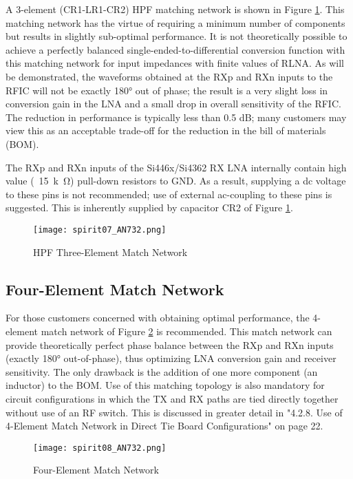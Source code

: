       A 3-element (CR1-LR1-CR2) HPF matching network is shown in Figure \ref{EXP001:fig_spirit07}. 
      This matching network has the virtue of requiring a minimum number of components but results 
      in slightly sub-optimal performance. It is not theoretically possible to achieve a perfectly 
      balanced single-ended-to-differential conversion function with this matching network for 
      input impedances with finite values of RLNA. As will be demonstrated, the waveforms obtained 
      at the RXp and RXn inputs to the RFIC will not be exactly 180° out of phase; the result is a 
      very slight loss in conversion gain in the LNA and a small drop in overall sensitivity of the 
      RFIC. The reduction in performance is typically less than 0.5 dB; many customers may view 
      this as an acceptable trade-off for the reduction in the bill of materials (BOM).
      
      The RXp and RXn inputs of the Si446x/Si4362 RX LNA internally contain high value 
      (~\SI{15}{k\ohm}) pull-down resistors to GND. As a result, supplying a dc voltage to these 
      pins is not recommended; use of external ac-coupling to these pins is suggested. This is 
      inherently supplied by capacitor CR2 of Figure \ref{EXP001:fig_spirit07}.

      \begin{figure}[ht!]  %
        \centering
        \texttt{[image: spirit07\_AN732.png]}
        \caption{HPF Three-Element Match Network \cite[s.~2]{AN643SiliconLabs}}
        \label{EXP001:fig_spirit07}
      \end{figure}
      
    \subsection{Four-Element Match Network}
      For those customers concerned with obtaining optimal performance, the 4-element match network 
      of Figure \ref{EXP001:fig_spirit08} is recommended. This match network can provide 
      theoretically perfect phase balance between the RXp and RXn inputs (exactly 180° 
      out-of-phase), thus optimizing LNA conversion gain and receiver sensitivity. The only 
      drawback is the addition of one more component (an inductor) to the BOM. Use of this matching 
      topology is also mandatory for circuit configurations in which the TX and RX paths are tied 
      directly together without use of an RF switch. This is discussed in greater detail in 
      "4.2.8. Use of 4-Element Match Network in Direct Tie Board Configurations" on page 22.
      \begin{figure}[ht!]  %
        \centering
        \texttt{[image: spirit08\_AN732.png]}
        \caption{Four-Element Match Network \cite[s.~3]{AN643SiliconLabs}}
        \label{EXP001:fig_spirit08}
      \end{figure}
    

